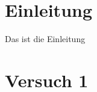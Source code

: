 \documentclass[12pt, oneside, a4paper, \docLanguage]{report}
\begin{document}

\setcounter{section}{0}



\clearpage

%
%


%
%


%
%
%

%
%
%



\setcounter{page}{1} 
\pagestyle{default}
%
%
\chapter{Einleitung}
\label{chap:EINL}
\begin{normalsize}
Das ist die Einleitung
\end{normalsize}


%
%
\chapter{Versuch 1}
\label{chap:VERSUCH_1}
\end{document}
